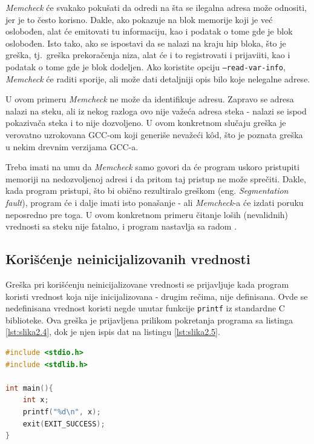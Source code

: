 \documentclass[12pt,oneside]{memoir}
\theoremstyle{plain}
\theoremstyle{definition}
\begin{document}
\textit{Memcheck} će svakako pokušati da odredi na šta se ilegalna adresa može odnositi, jer je to često korisno. Dakle, ako pokazuje na blok memorije koji je već oslobođen, alat će emitovati tu informaciju, kao i podatak o tome gde je blok oslobođen. Isto tako, ako se ispostavi da se nalazi na kraju hip bloka, što je greška, tj.~greška prekoračenja niza, alat će i to registrovati i prijaviiti, kao i podatak o tome gde je blok dodeljen. Ako koristite opciju \texttt{--read-var-info}, \textit{Memcheck} će raditi sporije, ali može dati detaljniji opis bilo koje nelegalne adrese.

U ovom primeru \textit{Memcheck} ne može da identifikuje adresu. Zapravo se adresa nalazi na steku, ali iz nekog razloga ovo nije važeća adresa steka - nalazi se ispod pokazivača steka i to nije dozvoljeno. U ovom konkretnom slučaju greška je verovatno uzrokovana GCC-om koji generiše nevažeći k\^od, što je poznata greška u nekim drevnim verzijama GCC-a.

Treba imati na umu da \textit{Memcheck} samo govori da će program uskoro pristupiti memoriji na nedozvoljenoj adresi i da pritom taj pristup ne može sprečiti. Dakle, kada program pristupi, što bi obično rezultiralo greškom (eng. \textit{Segmentation fault}), program će i dalje imati isto ponašanje - ali \textit{Memcheck}-a će izdati poruku neposredno pre toga. U ovom konkretnom primeru čitanje loših (nevalidnih) vrednosti sa steku nije fatalno, i program nastavlja sa radom \cite{Memcheck}. 

\subsection{Korišćenje neinicijalizovanih vrednosti}
Greška pri korišćenju neinicijalizovane vrednosti se prijavljuje kada program koristi vrednost koja nije inicijalizovana - drugim rečima, nije definisana. Ovde se nedefinisana vrednost koristi negde unutar funkcije \texttt{printf} iz standardne C biblioteke. Ova greška je prijavljena prilikom pokretanja programa sa listinga \ref{lst:slika2.4}, dok je njen ispis dat na listingu \ref{lst:slika2.5}.

\begin{lstlisting}[style=mystyle,caption={Program koji izaziva grešku korišćenja neinicijalizovanih vrednosti}, label={lst:slika2.4},language={C}] 
#include <stdio.h>
#include <stdlib.h>

int main(){
	int x;
	printf("%d\n", x);
	exit(EXIT_SUCCESS);
}
\end{lstlisting}
\end{document}
